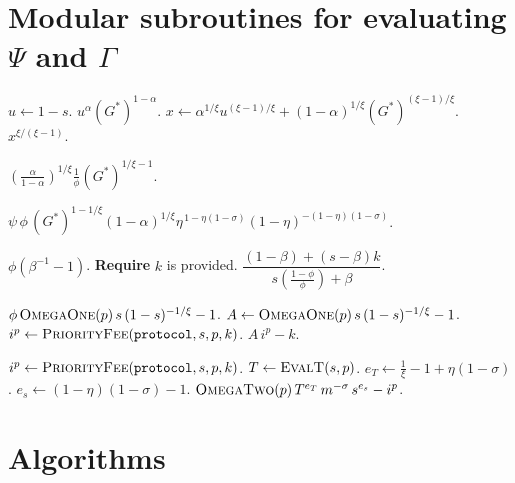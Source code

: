 \documentclass[11pt]{article}
\begin{document}
\section{Modular subroutines for evaluating $\Psi$ and $\Gamma$}
\begin{algorithm}[H]
\caption{\textsc{ResidualSubroutines}$(\texttt{protocol},p,k)$}
\begin{algorithmic}[1]
    \State $u \gets 1-s$.
        \State \Return $u^{\alpha}(G^*)^{1-\alpha}$.
    \Else
        \State $x \gets \alpha^{1/\xi}u^{(\xi-1)/\xi} + (1-\alpha)^{1/\xi}(G^*)^{(\xi-1)/\xi}$.
        \State \Return $x^{\xi/(\xi-1)}$.
    \EndIf
\EndFunction

    \State \Return $\left(\frac{\alpha}{1-\alpha}\right)^{1/\xi}\frac{1}{\phi}(G^*)^{1/\xi-1}$.
\EndFunction

    \State \Return $\psi\,\phi\,(G^*)^{1-1/\xi}(1-\alpha)^{1/\xi}\eta^{\,1-\eta(1-\sigma)}(1-\eta)^{-(1-\eta)(1-\sigma)}$.
\EndFunction

        \State \Return $\phi(\beta^{-1}-1)$.
    \Else
        \State \textbf{Require} $k$ is provided.
        \State \Return $\dfrac{(1-\beta)+(s-\beta)k}{s\left(\frac{1-\phi}{\phi}\right)+\beta}$.
    \EndIf
\EndFunction

        \State \Return $\phi\,\textsc{OmegaOne}(p)\,s\,(1-s)^{-1/\xi}-1$.
    \Else
        \State $A \gets \textsc{OmegaOne}(p)\,s\,(1-s)^{-1/\xi}-1$.
        \State $i^p \gets \textsc{PriorityFee}(\texttt{protocol},s,p,k)$.
        \State \Return $A\,i^p-k$.
    \EndIf
\EndFunction

    \State $i^p \gets \textsc{PriorityFee}(\texttt{protocol},s,p,k)$.
    \State $T \gets \textsc{EvalT}(s,p)$.
    \State $e_T \gets \frac{1}{\xi}-1+\eta(1-\sigma)$.
    \State $e_s \gets (1-\eta)(1-\sigma)-1$.
    \State \Return $\textsc{OmegaTwo}(p)\,T^{e_T}\,m^{-\sigma}\,s^{e_s}-i^p$.
\EndFunction
\end{algorithmic}
\end{algorithm}

\section{Algorithms}
\end{document}
